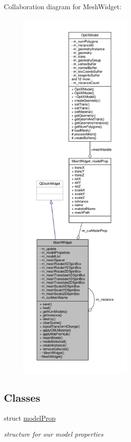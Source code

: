 Collaboration diagram for Mesh\-Widget\-:
\nopagebreak
\begin{figure}[H]
\begin{center}
\leavevmode
\includegraphics[height=550pt]{class_mesh_widget__coll__graph}
\end{center}
\end{figure}
\subsection*{Classes}
\begin{DoxyCompactItemize}
\item 
struct \hyperlink{struct_mesh_widget_1_1model_prop}{model\-Prop}
\begin{DoxyCompactList}\small\item\em structure for our model properties \end{DoxyCompactList}\end{DoxyCompactItemize}
